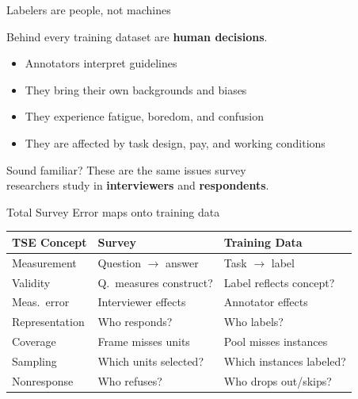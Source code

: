 \documentclass[aspectratio=169,11pt]{beamer}
\begin{document}
\begin{frame}{Labelers are people, not machines}

Behind every training dataset are \textbf{human decisions}.

\vspace{1em}

\begin{itemize}
  \item Annotators interpret guidelines
  \item They bring their own backgrounds and biases
  \item They experience fatigue, boredom, and confusion
  \item They are affected by task design, pay, and working conditions
\end{itemize}

\vspace{1em}

Sound familiar? These are the same issues survey\\
researchers study in \textbf{interviewers} and \textbf{respondents}.
\end{frame}

\begin{frame}{Total Survey Error maps onto training data}
\begin{center}
\small
\begin{tabular}{lll}
\toprule
\textbf{TSE Concept} & \textbf{Survey} & \textbf{Training Data} \\
\midrule
Measurement & Question $\to$ answer & Task $\to$ label \\
Validity & Q.\ measures construct? & Label reflects concept? \\
Meas.\ error & Interviewer effects & Annotator effects \\
Representation & Who responds? & Who labels? \\
Coverage & Frame misses units & Pool misses instances \\
Sampling & Which units selected? & Which instances labeled? \\
Nonresponse & Who refuses? & Who drops out/skips? \\
\bottomrule
\end{tabular}
\end{center}
\end{frame}
\end{document}
